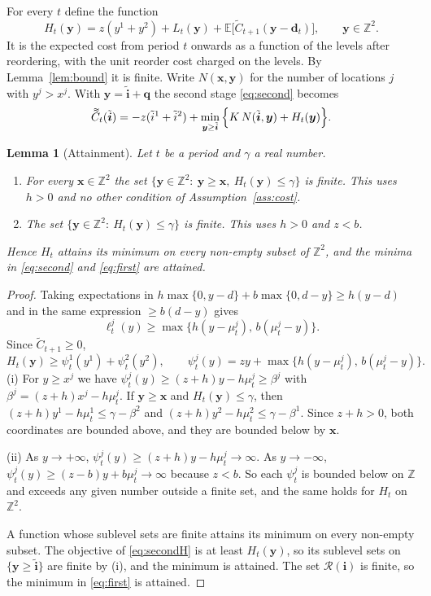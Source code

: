 \documentclass[11pt]{article}
\DeclareRobustCommand{\dbtilde}[1]{\accentset{\approx}{#1}}
\renewcommand{\vec}[1]{\boldsymbol{#1}}
\newcommand{\E}{\mathbb{E}}
\newcommand{\Z}{\mathbb{Z}}
\newcommand{\R}{\mathcal{R}}
\newcommand{\Ct}{\widetilde{C}}
\newcommand{\Cq}{\dbtilde{C}}
\newtheorem{lemma}{Lemma}
\theoremstyle{definition}
\begin{document}
For every $t$ define the function
\begin{equation}\label{eq:H}
H_t(\vec{y})=z(y^1+y^2)+L_t(\vec{y})+\E\big[\Ct_{t+1}(\vec{y}-\vec{d}_t)\big],\qquad \vec{y}\in\Z^2 .
\end{equation}
It is the expected cost from period $t$ onwards as a function of the levels after reordering, with the unit reorder cost charged on the levels. By Lemma~\ref{lem:bound} it is finite. Write $N(\vec{x},\vec{y})$ for the number of locations $j$ with $y^j>x^j$. With $\vec{y}=\tilde{\vec{i}}+\vec{q}$ the second stage \eqref{eq:second} becomes
\begin{equation}\label{eq:secondH}
\Cq_t(\tilde{\vec{i}})=-z(\tilde{i}^1+\tilde{i}^2)+\min_{\vec{y}\ge\tilde{\vec{i}}}\Big\{K\,N(\tilde{\vec{i}},\vec{y})+H_t(\vec{y})\Big\}.
\end{equation}

\begin{lemma}[Attainment]\label{lem:coercive}
Let $t$ be a period and $\gamma$ a real number.
\begin{enumerate}[label=(\roman*)]
\item For every $\vec{x}\in\Z^2$ the set $\{\vec{y}\in\Z^2:\ \vec{y}\ge\vec{x},\ H_t(\vec{y})\le\gamma\}$ is finite. This uses $h>0$ and no other condition of Assumption~\ref{ass:cost}.
\item The set $\{\vec{y}\in\Z^2:\ H_t(\vec{y})\le\gamma\}$ is finite. This uses $h>0$ and $z<b$.
\end{enumerate}
Hence $H_t$ attains its minimum on every non-empty subset of $\Z^2$, and the minima in \eqref{eq:second} and \eqref{eq:first} are attained.
\end{lemma}

\begin{proof}
Taking expectations in $h\max\{0,y-d\}+b\max\{0,d-y\}\ge h(y-d)$ and in the same expression $\ge b(d-y)$ gives
\begin{equation}\label{eq:ellbound}
\ell^j_t(y)\ge\max\{h(y-\mu^j_t),\,b(\mu^j_t-y)\}.
\end{equation}
Since $\Ct_{t+1}\ge 0$,
\[
H_t(\vec{y})\ge\psi^1_t(y^1)+\psi^2_t(y^2),\qquad \psi^j_t(y)=zy+\max\{h(y-\mu^j_t),\,b(\mu^j_t-y)\}.
\]
(i) For $y\ge x^j$ we have $\psi^j_t(y)\ge(z+h)y-h\mu^j_t\ge\beta^j$ with $\beta^j=(z+h)x^j-h\mu^j_t$. If $\vec{y}\ge\vec{x}$ and $H_t(\vec{y})\le\gamma$, then $(z+h)y^1-h\mu^1_t\le\gamma-\beta^2$ and $(z+h)y^2-h\mu^2_t\le\gamma-\beta^1$. Since $z+h>0$, both coordinates are bounded above, and they are bounded below by $\vec{x}$.

(ii) As $y\to+\infty$, $\psi^j_t(y)\ge(z+h)y-h\mu^j_t\to\infty$. As $y\to-\infty$, $\psi^j_t(y)\ge(z-b)y+b\mu^j_t\to\infty$ because $z<b$. So each $\psi^j_t$ is bounded below on $\Z$ and exceeds any given number outside a finite set, and the same holds for $H_t$ on $\Z^2$.

A function whose sublevel sets are finite attains its minimum on every non-empty subset. The objective of \eqref{eq:secondH} is at least $H_t(\vec{y})$, so its sublevel sets on $\{\vec{y}\ge\tilde{\vec{i}}\}$ are finite by (i), and the minimum is attained. The set $\R(\vec{i})$ is finite, so the minimum in \eqref{eq:first} is attained.
\end{proof}
\end{document}
